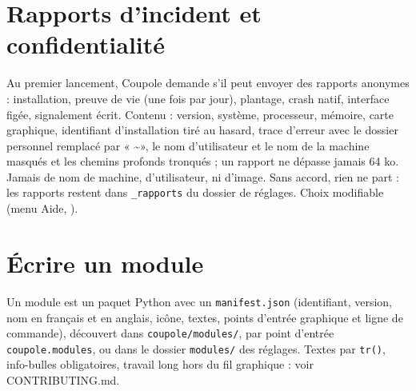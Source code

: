 \section{Rapports d'incident et confidentialité}
Au premier lancement, Coupole demande s'il peut envoyer des rapports anonymes : installation, preuve de vie (une
fois par jour), plantage, crash natif, interface figée, signalement écrit. Contenu : version, système, processeur,
mémoire, carte graphique, identifiant d'installation tiré au hasard, trace d'erreur avec le dossier personnel
remplacé par « \textasciitilde », le nom d'utilisateur et le nom de la machine masqués et les chemins profonds
tronqués ; un rapport ne dépasse jamais 64 ko. Jamais de nom de machine, d'utilisateur, ni d'image. Sans accord, rien ne part : les rapports restent dans \texttt{\_rapports} du
dossier de réglages. Choix modifiable (menu Aide, ).

\section{Écrire un module}
Un module est un paquet Python avec un \texttt{manifest.json} (identifiant, version, nom en français et en anglais,
icône, textes, points d'entrée graphique et ligne de commande), découvert dans \texttt{coupole/modules/}, par point
d'entrée \texttt{coupole.modules}, ou dans le dossier \texttt{modules/} des réglages. Textes par \texttt{tr()},
info-bulles obligatoires, travail long hors du fil graphique : voir CONTRIBUTING.md.

